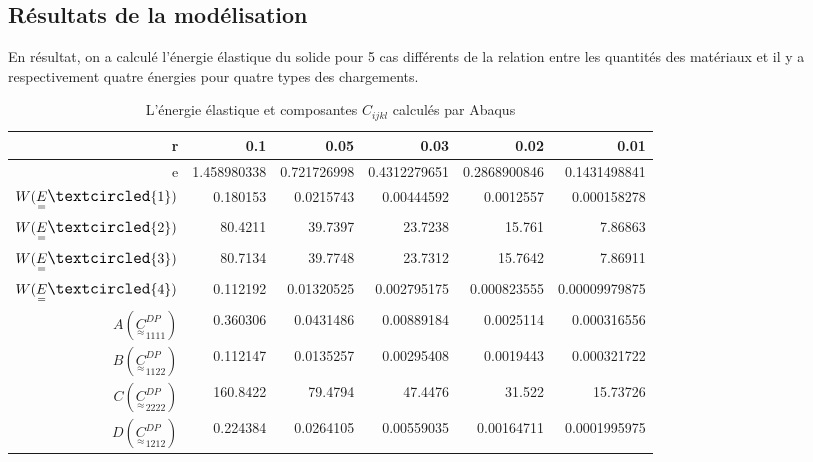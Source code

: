 \documentclass{article}
\newcommand\waveC{\underset{\approx}{C}}
\begin{document}
\subsection{Résultats de la modélisation}

En résultat, on a calculé l'énergie élastique du solide pour 5 cas différents de la relation entre les quantités des matériaux et il y a respectivement quatre énergies pour quatre types des chargements.
\begin{table}[H]
    \begin{tabular}{|r|r|r|r|r|r|}
        \hline
        r & 0.1         & 0.05        & 0.03         & 0.02         & 0.01          \\ \hline
        e & 1.458980338 & 0.721726998 & 0.4312279651 & 0.2868900846 & 0.1431498841  \\ \hline
        $W(\underset{=}{E}\large{\textcircled{\small{1}}})$ & 0.180153    & 0.0215743   & 0.00444592   & 0.0012557    & 0.000158278   \\ \hline
        $W(\underset{=}{E}\large{\textcircled{\small{2}}})$ & 80.4211     & 39.7397     & 23.7238      & 15.761       & 7.86863       \\ \hline
        $W(\underset{=}{E}\large{\textcircled{\small{3}}})$ & 80.7134     & 39.7748     & 23.7312      & 15.7642      & 7.86911       \\ \hline
        $W(\underset{=}{E}\large{\textcircled{\small{4}}})$ & 0.112192    & 0.01320525  & 0.002795175  & 0.000823555  & 0.00009979875 \\ \hline
        $A(\waveC_{1111}^{DP})$ & 0.360306    & 0.0431486   & 0.00889184   & 0.0025114    & 0.000316556   \\ \hline
        $B(\waveC^{DP}_{1122})$ & 0.112147    & 0.0135257   & 0.00295408   & 0.0019443    & 0.000321722   \\ \hline
        $C(\waveC^{DP}_{2222})$ & 160.8422    & 79.4794     & 47.4476      & 31.522       & 15.73726      \\ \hline
        $D(\waveC^{DP}_{1212})$ & 0.224384    & 0.0264105   & 0.00559035   & 0.00164711   & 0.0001995975  \\ \hline
    \end{tabular}
    \caption{L'énergie élastique et composantes $C_{ijkl}$ calculés par Abaqus}
\end{table}
\end{document}
